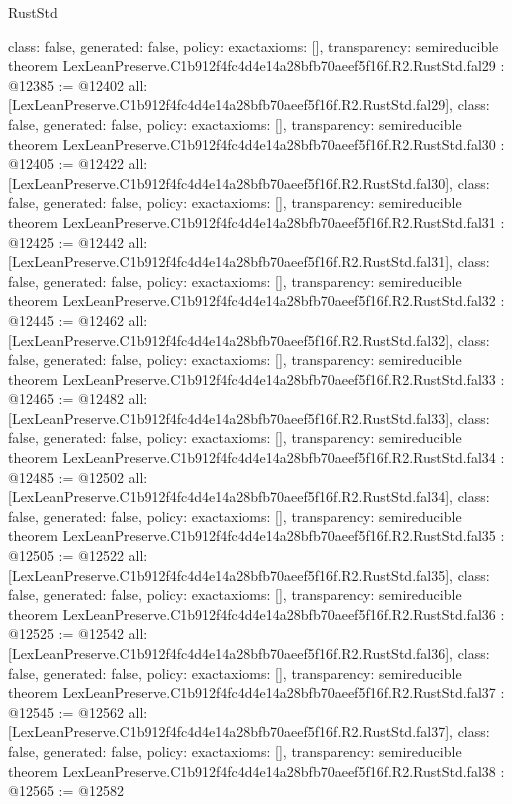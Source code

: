 \begin{lexlean}{RustStd}
\begin{coremodule}
{  class: false,
  generated: false,
  policy: exact{axioms: []},
  transparency: semireducible
}
theorem LexLeanPreserve.C1b912f4fc4d4e14a28bfb70aeef5f16f.R2.RustStd.fal29 : @12385 := @12402 {
  all: [LexLeanPreserve.C1b912f4fc4d4e14a28bfb70aeef5f16f.R2.RustStd.fal29],
  class: false,
  generated: false,
  policy: exact{axioms: []},
  transparency: semireducible
}
theorem LexLeanPreserve.C1b912f4fc4d4e14a28bfb70aeef5f16f.R2.RustStd.fal30 : @12405 := @12422 {
  all: [LexLeanPreserve.C1b912f4fc4d4e14a28bfb70aeef5f16f.R2.RustStd.fal30],
  class: false,
  generated: false,
  policy: exact{axioms: []},
  transparency: semireducible
}
theorem LexLeanPreserve.C1b912f4fc4d4e14a28bfb70aeef5f16f.R2.RustStd.fal31 : @12425 := @12442 {
  all: [LexLeanPreserve.C1b912f4fc4d4e14a28bfb70aeef5f16f.R2.RustStd.fal31],
  class: false,
  generated: false,
  policy: exact{axioms: []},
  transparency: semireducible
}
theorem LexLeanPreserve.C1b912f4fc4d4e14a28bfb70aeef5f16f.R2.RustStd.fal32 : @12445 := @12462 {
  all: [LexLeanPreserve.C1b912f4fc4d4e14a28bfb70aeef5f16f.R2.RustStd.fal32],
  class: false,
  generated: false,
  policy: exact{axioms: []},
  transparency: semireducible
}
theorem LexLeanPreserve.C1b912f4fc4d4e14a28bfb70aeef5f16f.R2.RustStd.fal33 : @12465 := @12482 {
  all: [LexLeanPreserve.C1b912f4fc4d4e14a28bfb70aeef5f16f.R2.RustStd.fal33],
  class: false,
  generated: false,
  policy: exact{axioms: []},
  transparency: semireducible
}
theorem LexLeanPreserve.C1b912f4fc4d4e14a28bfb70aeef5f16f.R2.RustStd.fal34 : @12485 := @12502 {
  all: [LexLeanPreserve.C1b912f4fc4d4e14a28bfb70aeef5f16f.R2.RustStd.fal34],
  class: false,
  generated: false,
  policy: exact{axioms: []},
  transparency: semireducible
}
theorem LexLeanPreserve.C1b912f4fc4d4e14a28bfb70aeef5f16f.R2.RustStd.fal35 : @12505 := @12522 {
  all: [LexLeanPreserve.C1b912f4fc4d4e14a28bfb70aeef5f16f.R2.RustStd.fal35],
  class: false,
  generated: false,
  policy: exact{axioms: []},
  transparency: semireducible
}
theorem LexLeanPreserve.C1b912f4fc4d4e14a28bfb70aeef5f16f.R2.RustStd.fal36 : @12525 := @12542 {
  all: [LexLeanPreserve.C1b912f4fc4d4e14a28bfb70aeef5f16f.R2.RustStd.fal36],
  class: false,
  generated: false,
  policy: exact{axioms: []},
  transparency: semireducible
}
theorem LexLeanPreserve.C1b912f4fc4d4e14a28bfb70aeef5f16f.R2.RustStd.fal37 : @12545 := @12562 {
  all: [LexLeanPreserve.C1b912f4fc4d4e14a28bfb70aeef5f16f.R2.RustStd.fal37],
  class: false,
  generated: false,
  policy: exact{axioms: []},
  transparency: semireducible
}
theorem LexLeanPreserve.C1b912f4fc4d4e14a28bfb70aeef5f16f.R2.RustStd.fal38 : @12565 := @12582 {
}
\end{coremodule}
\end{lexlean}
